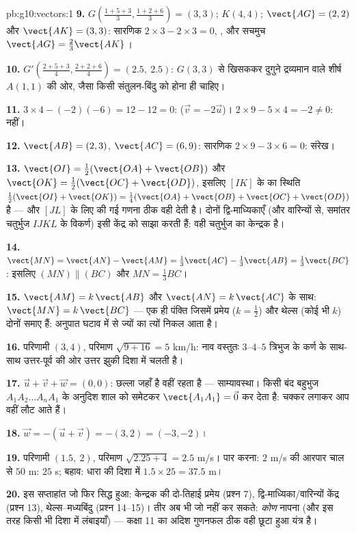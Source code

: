 \begin{solution}{pb:g10:vectors:1}
\textbf{9.} $G\left(\frac{1+5+3}{3}, \frac{1+2+6}{3}\right) =
(3, 3)$; $K(4, 4)$; $\vect{AG} = (2, 2)$ और $\vect{AK} = (3, 3)$: सारणिक $2 \times 3 - 2 \times 3 = 0$, , और सचमुच
$\vect{AG} = \frac23\vect{AK}$।

\textbf{10.} $G'\left(\frac{2 + 5 + 3}{4}, \frac{2 + 2 +
6}{4}\right) = (2.5,\ 2.5)$: $G(3,3)$ से खिसककर दुगुने द्रव्यमान वाले शीर्ष $A(1,1)$ की ओर,
जैसा किसी संतुलन-बिंदु को होना ही चाहिए।

\textbf{11.} $3 \times 4 - (-2)(-6) = 12 - 12 = 0$:  ($\vec v = -2\vec u$)। $2 \times 9 - 5 \times 4 = -2 \neq 0$:  नहीं।

\textbf{12.} $\vect{AB} = (2, 3)$, $\vect{AC} = (6, 9)$: सारणिक $2 \times 9 - 3 \times 6 = 0$: संरेख।

\textbf{13.} $\vect{OI} = \frac12(\vect{OA} + \vect{OB})$ और $\vect{OK} = \frac12(\vect{OC} + \vect{OD})$, इसलिए $[IK]$ के  का स्थिति  $\frac12(\vect{OI} + \vect{OK}) = \frac14(\vect{OA} +
\vect{OB} + \vect{OC} + \vect{OD})$
है --- और $[JL]$ के लिए की गई गणना ठीक वही  देती है। दोनों
द्वि-माध्यिकाएँ (और वारिन्यों से, समांतर चतुर्भुज $IJKL$ के विकर्ण) इसी
केंद्र को साझा करती हैं: वही चतुर्भुज का केन्द्रक है।

\textbf{14.} $\vect{MN} = \vect{AN} - \vect{AM} =
\frac13\vect{AC} - \frac13\vect{AB} = \frac13\vect{BC}$: इसलिए $(MN) \parallel (BC)$ और $MN = \frac13 BC$।

\textbf{15.} $\vect{AM} = k\,\vect{AB}$ और $\vect{AN} = k\,\vect{AC}$ के साथ: $\vect{MN} = k\,\vect{BC}$ --- एक ही पंक्ति जिसमें 
प्रमेय ($k = \frac12$) और थेल्स (कोई भी $k$) दोनों समाए हैं: अनुपात घटाव में से
ज्यों का त्यों निकल आता है।

\textbf{16.} परिणामी $(3, 4)$, परिमाण $\sqrt{9 + 16} = 5$ km/h: नाव वस्तुतः $3$--$4$--$5$
त्रिभुज के कर्ण के साथ-साथ उत्तर-पूर्व की ओर उत्तर झुकी दिशा में चलती है।

\textbf{17.} $\vec u + \vec v + \vec w = (0, 0)$: छल्ला जहाँ है वहीं रहता है --- साम्यावस्था। किसी बंद
बहुभुज $A_1 A_2 \dots A_n A_1$ के अनुदिश शाल  को समेटकर $\vect{A_1 A_1} = \vec 0$ कर देता है: चक्कर लगाकर आप
वहीं लौट आते हैं।

\textbf{18.} $\vec w = -(\vec u + \vec v) = -(3, 2) =
(-3, -2)$।

\textbf{19.} परिणामी $(1.5,\ 2)$, परिमाण $\sqrt{2.25 + 4} = 2.5$ m/s। पार करना: $2$ m/s की आरपार
चाल से $50$ m: $25$ s; बहाव: धारा की दिशा में $1.5 \times 25 = 37.5$ m।

\textbf{20.} इस सप्ताहांत जो फिर सिद्ध हुआ: केन्द्रक की दो-तिहाई प्रमेय
(प्रश्न 7), द्वि-माध्यिका/वारिन्यों केंद्र (प्रश्न 13), थेल्स--मध्यबिंदु
(प्रश्न 14--15)। तीर अब भी जो नहीं कर सकते: \emph{कोण} नापना (और इस तरह किसी
भी दिशा में लंबाइयाँ) --- कक्षा 11 का अदिश गुणनफल ठीक वही छूटा हुआ यंत्र है।
\end{solution}
